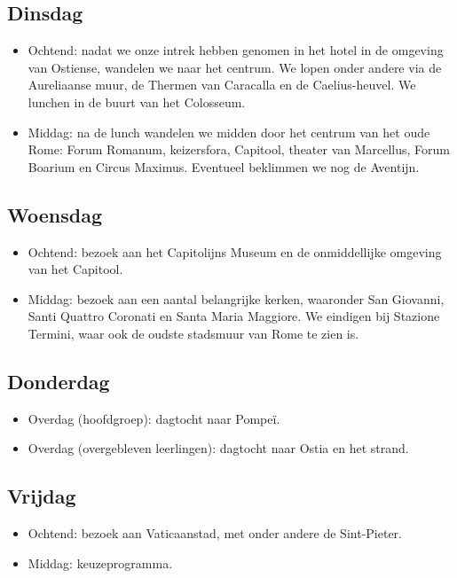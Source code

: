 \documentclass[10pt,twoside,a5paper]{article}
\begin{document}
\subsection*{Dinsdag}
\begin{itemize}
  \item Ochtend: nadat we onze intrek hebben genomen in het hotel in de omgeving van Ostiense, wandelen we naar het centrum. We lopen onder andere via de Aureliaanse muur, de Thermen van Caracalla en de Caelius-heuvel. We lunchen in de buurt van het Colosseum.
  \item Middag: na de lunch wandelen we midden door het centrum van het oude Rome: Forum Romanum, keizersfora, Capitool, theater van Marcellus, Forum Boarium en Circus Maximus. Eventueel beklimmen we nog de Aventijn.
\end{itemize}

\subsection*{Woensdag}
\begin{itemize}
  \item Ochtend: bezoek aan het Capitolijns Museum en de onmiddellijke omgeving van het Capitool.
  \item Middag: bezoek aan een aantal belangrijke kerken, waaronder San Giovanni, Santi Quattro Coronati en Santa Maria Maggiore. We eindigen bij Stazione Termini, waar ook de oudste stadsmuur van Rome te zien is.
\end{itemize}

\subsection*{Donderdag}
\begin{itemize}
  \item Overdag (hoofdgroep): dagtocht naar Pompeï.
  \item Overdag (overgebleven leerlingen): dagtocht naar Ostia en het strand.
\end{itemize}

\subsection*{Vrijdag}
\begin{itemize}
  \item Ochtend: bezoek aan Vaticaanstad, met onder andere de Sint-Pieter.
  \item Middag: keuzeprogramma.
\end{itemize}
\end{document}
